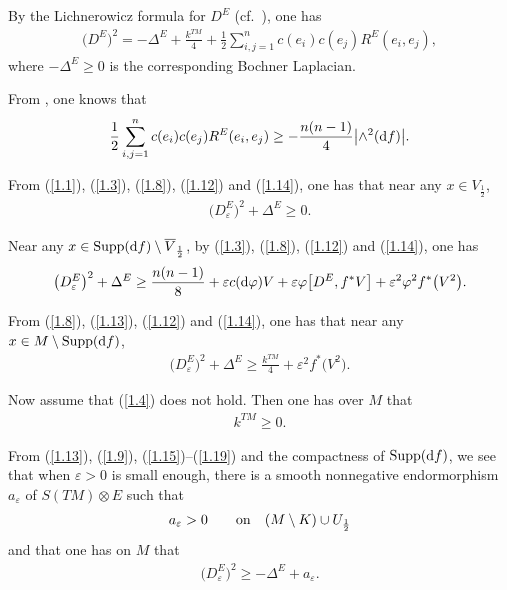 \documentclass[10pt,a4paper]{amsart}
\numberwithin{equation}{section}
\theoremstyle{definition}
\begin{document}
 By the Lichnerowicz formula \cite{L63} for $D^E$ (cf.~\cite{LaMi89}), one has
\begin{gather}\label{1.12}
\big(D^E\big)^2=-\Delta^E+\frac{k^{TM}}{4}+\frac{1}{2}\sum_{i, j=1}^n c (e_i )c (e_j )R^E (e_i,e_j ) ,
\end{gather}
where $-\Delta^E\geq 0$ is the corresponding Bochner Laplacian.

From \cite[equation~(4.6)]{L98}, one knows that
\begin{gather}\label{1.14}
\frac{1}{2}\sum_{i, j=1}^n c (e_i )c (e_j )R^E (e_i,e_j )\geq -\frac{n(n-1)}{4}\big|{\wedge}^2({\rm d}f)\big|.
\end{gather}

From (\ref{1.1}), (\ref{1.3}), (\ref{1.8}), (\ref{1.12}) and (\ref{1.14}), one has that near any $x\in V_{\frac{1}{2}}$,
\begin{gather}\label{1.15}
\big(D_\varepsilon^E\big)^2+\Delta^E \geq0.
\end{gather}

Near any $x\in \operatorname{Supp}({\rm d}f)\setminus \overline{V}_{\frac{1}{2}}$, by
(\ref{1.3}), (\ref{1.8}), (\ref{1.12}) and (\ref{1.14}), one has
\begin{gather}\label{1.16}
\big(D_\varepsilon^E\big)^2+\Delta^E \geq \frac{n(n-1)}{8}+\varepsilon c({\rm d}\varphi)V+\varepsilon \varphi \big[D^E,f^*V\big]+\varepsilon^2\varphi^2f^*\big(V^2\big).
\end{gather}

From (\ref{1.8}), (\ref{1.13}), (\ref{1.12}) and (\ref{1.14}), one has that near any $x\in M\setminus \operatorname{Supp}({\rm d}f)$,
\begin{gather}\label{1.18}
\big(D_\varepsilon^E\big)^2+\Delta^E \geq \frac{k^{TM}}{4}+\varepsilon^2f^*\big(V^2\big).
\end{gather}

Now assume that (\ref{1.4}) does not hold. Then one has over $M$ that
 \begin{gather}\label{1.19}
k^{TM}\geq 0.
\end{gather}

From (\ref{1.13}), (\ref{1.9}), (\ref{1.15})--(\ref{1.19}) and the compactness of $\operatorname{Supp}({\rm d}f)$, we see that when $\varepsilon>0$ is small enough, there is a smooth nonnegative endormorphism $a_\varepsilon$ of $S(TM)\widehat\otimes E$ such that
 \begin{gather}\label{1.20}
a_\varepsilon>0 \qquad {\rm on}\quad (M\setminus K)\cup U_{\frac{1}{2}}
\end{gather}
and that one has on $M$ that
\begin{gather}\label{1.21}
\big(D_\varepsilon^E\big)^2 \geq -\Delta^E +a_\varepsilon.
\end{gather}
\end{document}
